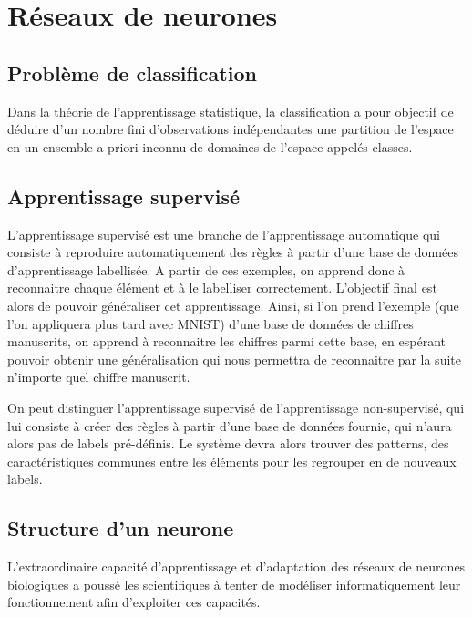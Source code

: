 \chapter{Réseaux de neurones}

\section{Problème de classification}
Dans la théorie de l'apprentissage statistique, la classification a pour objectif de déduire d'un nombre fini d'observations indépendantes une partition de l'espace en un ensemble a priori inconnu de domaines de l'espace appelés classes. 



\section{Apprentissage supervisé}

L'apprentissage supervisé est une branche de l'apprentissage automatique qui consiste à reproduire automatiquement des règles à partir d'une base de données d'apprentissage labellisée.
A partir de ces exemples, on apprend donc à reconnaitre chaque élément et à le labelliser correctement. L'objectif final est alors de pouvoir généraliser cet apprentissage.
Ainsi, si l'on prend l'exemple (que l'on appliquera plus tard avec MNIST) d'une base de données de chiffres manuscrits, on apprend à reconnaitre les chiffres parmi cette base, en espérant pouvoir obtenir une généralisation qui nous permettra de reconnaitre par la suite n'importe quel chiffre manuscrit.

On peut distinguer l'apprentissage supervisé de l'apprentissage non-supervisé, qui lui consiste à créer des règles à partir d'une base de données fournie, qui n'aura alors pas de labels pré-définis. Le système devra alors trouver des patterns, des caractéristiques communes entre les éléments pour les regrouper en de nouveaux labels.

\section{Structure d'un neurone}

L'extraordinaire capacité d'apprentissage et d'adaptation des réseaux de neurones biologiques a poussé les scientifiques à tenter de modéliser informatiquement leur fonctionnement afin d'exploiter ces capacités. 

